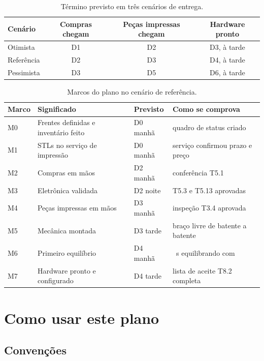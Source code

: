 \documentclass[11pt,a4paper]{article}
\newcommand{\cmd}[1]{\texttt{\detokenize{#1}}}   %
\begin{document}
\begin{table}[H]
\centering\small
\caption{Término previsto em três cenários de entrega.}
\label{tab:cenarios}
\begin{tabular}{@{}lccc@{}}
\toprule
Cenário & Compras chegam & Peças impressas chegam & Hardware pronto \\
\midrule
Otimista   & D1 & D2 & D3, à tarde \\
Referência & D2 & D3 & D4, à tarde \\
Pessimista & D3 & D5 & D6, à tarde \\
\bottomrule
\end{tabular}
\end{table}

\begin{table}[H]
\centering\small
\caption{Marcos do plano no cenário de referência.}
\label{tab:marcos}
\begin{tabularx}{\textwidth}{@{}l>{\raggedright\arraybackslash}Xl>{\raggedright\arraybackslash}X@{}}
\toprule
Marco & Significado & Previsto & Como se comprova \\
\midrule
M0 & Frentes definidas e inventário feito & D0 manhã & quadro de status criado \\
M1 & STLs no serviço de impressão & D0 manhã & serviço confirmou prazo e preço \\
M2 & Compras em mãos & D2 manhã & conferência T5.1 \\
M3 & Eletrônica validada & D2 noite & T5.3 e T5.13 aprovadas \\
M4 & Peças impressas em mãos & D3 manhã & inspeção T3.4 aprovada \\
M5 & Mecânica montada & D3 tarde & braço livre de batente a batente \\
M6 & Primeiro equilíbrio & D4 manhã & 30~s equilibrando com \cmd{imax 10} \\
M7 & Hardware pronto e configurado & D4 tarde & lista de aceite T8.2 completa \\
\bottomrule
\end{tabularx}
\end{table}

\section{Como usar este plano}
\label{sec:uso}

\subsection{Convenções}
\end{document}
